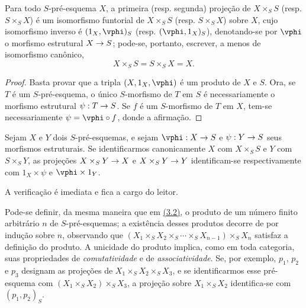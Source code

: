 \documentclass[oneside]{amsart}
\makeatletter
\newcommand{\ega@arrow}[2]{\mathchoice{#1}{#2}{#2}{#2}}
\renewcommand{\to}{\ega@arrow{\longrightarrow}{\rightarrow}}
\newcommand{\oldpage}[2][]{{\marginnote{\normalfont\textbf{#1}~|~#2}}\ignorespaces}
\let\EGAOriginalLabel\label
\renewcommand{\label}[1]{\phantomsection\EGAOriginalLabel{#1}}
\makeatother
\begin{document}
\begin{proposition}[3.3.3]
\label{I.3.3.3}
Para todo $S$-pré-esquema $X$, a primeira (resp. segunda) projeção de
$X\times_S S$ (resp. $S\times_S X$) é um isomorfismo funtorial de
$X\times_S S$ (resp. $S\times_S X$) sobre $X$, cujo isomorfismo inverso é
$(1_X,\vphi)_S$ (resp. $(\vphi,1_X)_S$), denotando-se por $\vphi$ o
morfismo estrutural $X\to S$; pode-se, portanto, escrever, a menos de
isomorfismo canônico,
\[
  X\times_S S=S\times_S X=X.
\]
\end{proposition}

\begin{proof}
Basta provar que a tripla $(X,1_X,\vphi)$ é um produto de $X$ e $S$. Ora, se
$T$ é um $S$-pré-esquema, o único $S$-morfismo de $T$ em $S$ é
necessariamente o morfismo estrutural $\psi:T\to S$. Se $f$ é um
$S$-morfismo de $T$ em $X$, tem-se necessariamente
$\psi=\vphi\circ f$, donde a afirmação.
\end{proof}

\begin{corollary}[3.3.4]
\label{I.3.3.4}
Sejam $X$ e $Y$ dois $S$-pré-esquemas, e sejam $\vphi:X\to S$ e
$\psi:Y\to S$ seus morfismos estruturais. Se identificarmos canonicamente
$X$ com $X\times_S S$ e $Y$ com $S\times_S Y$, as projeções
$X\times_S Y\to X$ e $X\times_S Y\to Y$ identificam-se respectivamente
com $1_X\times\psi$ e $\vphi\times 1_Y$.
\end{corollary}

A verificação é imediata e fica a cargo do leitor.

\begin{env}[3.3.5]
\label{I.3.3.5}
Pode-se definir, da mesma maneira que em
\hyperref[subsection:I.3.2]{(3.2)}, o produto de um
\oldpage[I]{109}
número finito arbitrário $n$ de $S$-pré-esquemas; a existência desses
produtos decorre de  por indução sobre $n$, observando que
$(X_1\times_S X_2\times_S\cdots\times_S X_{n-1})\times_S X_n$ satisfaz a
definição do produto. A unicidade do produto implica, como em toda categoria,
suas propriedades de \emph{comutatividade} e de \emph{associatividade}. Se,
por exemplo, $p_1$, $p_2$ e $p_3$ designam as projeções de
$X_1\times_S X_2\times_S X_3$, e se identificarmos esse pré-esquema com
$(X_1\times_S X_2)\times_S X_3$, a projeção sobre $X_1\times_S X_2$
identifica-se com $(p_1,p_2)_S$.
\end{env}
\end{document}
